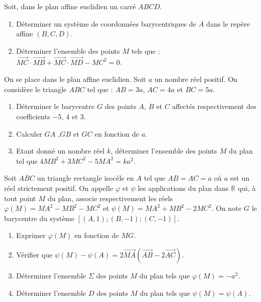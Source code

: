 %
\begin{exo}\label{exo:bary-8}
      Soit, dans le plan affine euclidien un carr\'e $ABCD$.
      \begin{enumerate}
            \item D\'eterminer un syst\`eme de coordonn\'ees barycentriques de $A$ dans le rep\`ere affine $(B,C,D)$.
            \item D\'eterminer l'ensemble des points $M$ tels que : 
                  $\overrightarrow{MC} \cdot \overrightarrow{MB} + \overrightarrow{MC} \cdot \overrightarrow{MD} - MC^2 = 0$.
      \end{enumerate}
\end{exo}
%
\begin{exo}\label{exo:bary-9}
      On se place dans le plan affine euclidien.
      Soit $a$ un nombre r\'eel positif.
      On consid\`ere le triangle $ABC$ tel que : $AB = 3a$, $AC = 4a$ et $BC = 5a$.
      \begin{enumerate}
            \item D\'eterminer le barycentre $G$ des points $A$, $B$ et $C$ 
                  affect\'es respectivement des coefficients $-5$, $4$ et $3$.
            \item Calculer $GA$ ,$GB$ et $GC$ en fonction de $a$.
            \item Etant donn\'e un nombre r\'eel $k$, d\'eterminer l'ensemble des points $M$ du plan tel que
                  $4 MB^2 + 3 MC^2 - 5 MA^2 = k a^2$.
      \end{enumerate}
\end{exo}
%
\begin{exo}\label{exo:bary-10}
      Soit $ABC$ un triangle rectangle isoc\`ele en $A$ tel que 
      $AB = AC = a$ o\`u $a$ est un r\'eel strictement positif.
      On appelle $\varphi$ et $\psi$ les applications du plan dans $\mathbb{R}$ qui, 
      \`a tout point $M$ du plan, associe respectivement les r\'eels 
      $\varphi (M) = MA^2 - MB^2 - MC^2$ et $\psi (M) = MA^2 + MB^2 - 2 MC^2$.
      On note $G$ le barycentre du syst\`eme $[(A,1) ; (B,-1) ; (C,-1)]$.
      \begin{enumerate}
            \item Exprimer $\varphi (M)$ en fonction de $MG$.
            \item V\'erifier que $\psi (M) - \psi (A) = 2 \overrightarrow{MA} (\overrightarrow{AB} - 2 \overrightarrow{AC})$.
            \item D\'eterminer l'ensemble $\Sigma$ des points $M$ du plan tels que $\varphi (M) = -a^2$.
            \item D\'eterminer l'ensemble $D$ des points $M$ du plan tels que $\psi (M) = \psi (A)$.
      \end{enumerate}
\end{exo}
